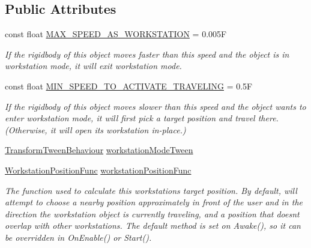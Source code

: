 \subsection*{Public Attributes}
\begin{DoxyCompactItemize}
\item 
const float \mbox{\hyperlink{class_leap_1_1_unity_1_1_examples_1_1_workstation_behaviour_example_af6897cc2e4142a3b82cddbc2b599c6e7}{M\+A\+X\+\_\+\+S\+P\+E\+E\+D\+\_\+\+A\+S\+\_\+\+W\+O\+R\+K\+S\+T\+A\+T\+I\+ON}} = 0.\+005F
\begin{DoxyCompactList}\small\item\em If the rigidbody of this object moves faster than this speed and the object is in workstation mode, it will exit workstation mode. \end{DoxyCompactList}\item 
const float \mbox{\hyperlink{class_leap_1_1_unity_1_1_examples_1_1_workstation_behaviour_example_a4643c3dd568f8e77904018de48eb4318}{M\+I\+N\+\_\+\+S\+P\+E\+E\+D\+\_\+\+T\+O\+\_\+\+A\+C\+T\+I\+V\+A\+T\+E\+\_\+\+T\+R\+A\+V\+E\+L\+I\+NG}} = 0.\+5F
\begin{DoxyCompactList}\small\item\em If the rigidbody of this object moves slower than this speed and the object wants to enter workstation mode, it will first pick a target position and travel there. (Otherwise, it will open its workstation in-\/place.) \end{DoxyCompactList}\item 
\mbox{\hyperlink{class_leap_1_1_unity_1_1_animation_1_1_transform_tween_behaviour}{Transform\+Tween\+Behaviour}} \mbox{\hyperlink{class_leap_1_1_unity_1_1_examples_1_1_workstation_behaviour_example_adbc6d2fc02014c49f40507fdeece6e75}{workstation\+Mode\+Tween}}
\item 
\mbox{\hyperlink{class_leap_1_1_unity_1_1_examples_1_1_workstation_behaviour_example_aa1eb03a23e58150cbb75aee152bb4d33}{Workstation\+Position\+Func}} \mbox{\hyperlink{class_leap_1_1_unity_1_1_examples_1_1_workstation_behaviour_example_acaf79ab190ba66fba74bb2eba58998ca}{workstation\+Position\+Func}}
\begin{DoxyCompactList}\small\item\em The function used to calculate this workstation\textquotesingle{}s target position. By default, will attempt to choose a nearby position approximately in front of the user and in the direction the workstation object is currently traveling, and a position that doesn\textquotesingle{}t overlap with other workstations. The default method is set on Awake(), so it can be overridden in On\+Enable() or Start(). \end{DoxyCompactList}\item 

\end{DoxyCompactItemize}
